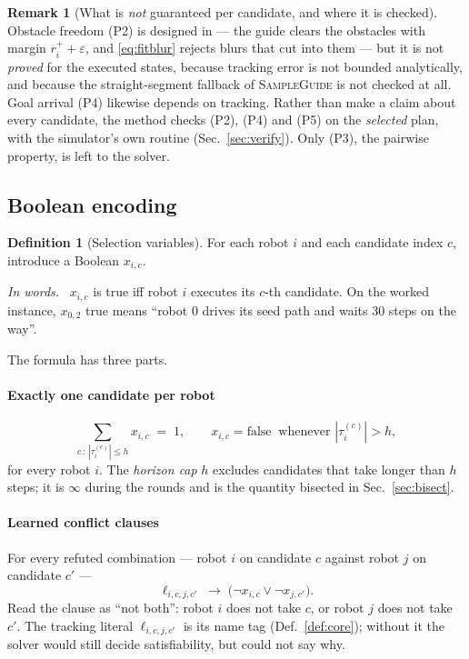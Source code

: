 \documentclass[conference]{IEEEtran}
\theoremstyle{plain}
\theoremstyle{definition}
\newtheorem{definition}{Definition}
\newtheorem{remark}{Remark}
\newcommand{\inwords}{\par\smallskip\noindent\textit{In words.}\ }
\newcommand{\clr}{\varepsilon}
\begin{document}
\begin{remark}[What is \emph{not} guaranteed per candidate, and where it is checked]
Obstacle freedom (P2) is designed in --- the guide clears the obstacles with margin
$r^{+}_i + \clr$, and \eqref{eq:fitblur} rejects blurs that cut into them --- but it is not
\emph{proved} for the executed states, because tracking error is not bounded analytically,
and because the straight-segment fallback of \textsc{SampleGuide} is not checked at all.
Goal arrival (P4) likewise depends on tracking. Rather than make a claim about every
candidate, the method checks (P2), (P4) and (P5) on the \emph{selected} plan, with the
simulator's own routine (Sec.~\ref{sec:verify}). Only (P3), the pairwise property, is left to
the solver.
\end{remark}

\subsection{Boolean encoding}
\label{sec:encoding}

\begin{definition}[Selection variables]
For each robot $i$ and each candidate index $c$, introduce a Boolean $x_{i,c}$.
\inwords
$x_{i,c}$ is true iff robot $i$ executes its $c$-th candidate. On the worked instance, $x_{0,2}$
true means ``robot $0$ drives its seed path and waits $30$ steps on the way''.
\end{definition}

The formula has three parts.

\paragraph*{Exactly one candidate per robot}
\begin{equation}
  \sum_{c\,:\,|\tau_i^{(c)}| \le h} x_{i,c} \;=\; 1,
  \qquad
  x_{i,c} = \text{false} \ \text{ whenever } |\tau_i^{(c)}| > h ,
  \label{eq:exactlyone}
\end{equation}
for every robot $i$. The \emph{horizon cap} $h$ excludes candidates that take longer than $h$
steps; it is $\infty$ during the rounds and is the quantity bisected in
Sec.~\ref{sec:bisect}.

\paragraph*{Learned conflict clauses}
For every refuted combination --- robot $i$ on candidate $c$ against robot $j$ on candidate
$c'$ ---
\begin{equation}
  \ell_{i,c,j,c'} \;\longrightarrow\; \big(\neg x_{i,c} \vee \neg x_{j,c'}\big).
  \label{eq:clause}
\end{equation}
Read the clause as ``not both'': robot $i$ does not take $c$, or robot $j$ does not take $c'$.
The tracking literal $\ell_{i,c,j,c'}$ is its name tag (Def.~\ref{def:core}); without it the
solver would still decide satisfiability, but could not say why.
\end{document}
